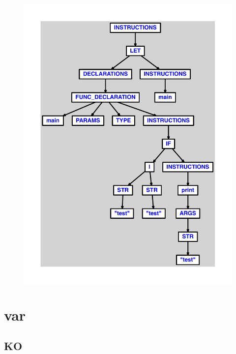 \documentclass{article}
\begin{document}
\begin{figure}[H]\centering\includegraphics[max width=\textwidth]{ast/ast_278.pdf}\end{figure}\section{var}
\subsection{KO}
\end{document}
